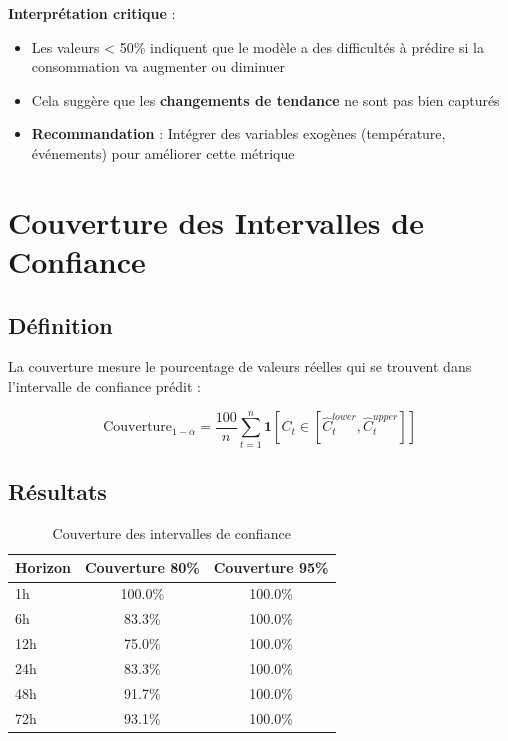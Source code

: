 \documentclass[12pt,a4paper]{article}
\begin{document}
\textbf{Interprétation critique} :
\begin{itemize}
    \item Les valeurs < 50\% indiquent que le modèle a des difficultés à prédire si la consommation va augmenter ou diminuer
    \item Cela suggère que les \textbf{changements de tendance} ne sont pas bien capturés
    \item \textbf{Recommandation} : Intégrer des variables exogènes (température, événements) pour améliorer cette métrique
\end{itemize}

\section{Couverture des Intervalles de Confiance}

\subsection{Définition}

La couverture mesure le pourcentage de valeurs réelles qui se trouvent dans l'intervalle de confiance prédit :

\begin{equation}
    \text{Couverture}_{1-\alpha} = \frac{100}{n}\sum_{t=1}^{n}\mathbf{1}[C_t \in [\hat{C}_t^{lower}, \hat{C}_t^{upper}]]
\end{equation}

\subsection{Résultats}

\begin{table}[h]
\centering
\caption{Couverture des intervalles de confiance}
\label{tab:couverture}
\begin{tabular}{lcc}
\toprule
\textbf{Horizon} & \textbf{Couverture 80\%} & \textbf{Couverture 95\%} \\
\midrule
1h & 100.0\% & 100.0\% \\
6h & 83.3\% & 100.0\% \\
12h & 75.0\% & 100.0\% \\
24h & 83.3\% & 100.0\% \\
48h & 91.7\% & 100.0\% \\
72h & 93.1\% & 100.0\% \\
\bottomrule
\end{tabular}
\end{table}
\end{document}
